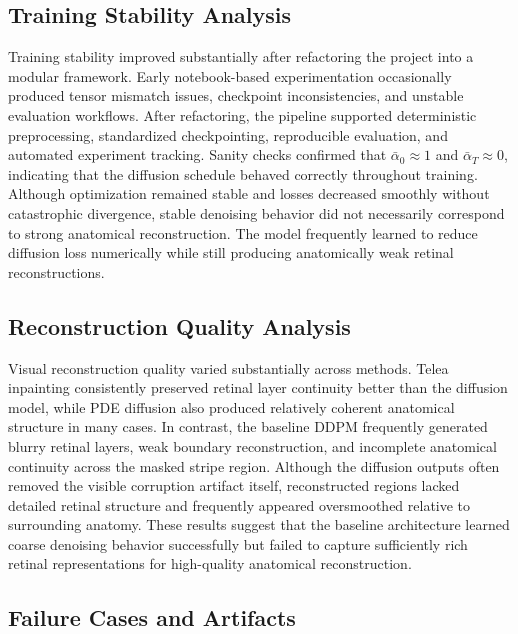 \documentclass[12pt,oneside]{article}
\begin{document}
\subsection*{Training Stability Analysis}

Training stability improved substantially after refactoring the project into a modular framework. Early notebook-based experimentation occasionally produced tensor mismatch issues, checkpoint inconsistencies, and unstable evaluation workflows. After refactoring, the pipeline supported deterministic preprocessing, standardized checkpointing, reproducible evaluation, and automated experiment tracking. Sanity checks confirmed that \(\bar{\alpha}_0 \approx 1\) and \(\bar{\alpha}_T \approx 0\), indicating that the diffusion schedule behaved correctly throughout training. Although optimization remained stable and losses decreased smoothly without catastrophic divergence, stable denoising behavior did not necessarily correspond to strong anatomical reconstruction. The model frequently learned to reduce diffusion loss numerically while still producing anatomically weak retinal reconstructions.

\subsection*{Reconstruction Quality Analysis}

Visual reconstruction quality varied substantially across methods. Telea inpainting consistently preserved retinal layer continuity better than the diffusion model, while PDE diffusion also produced relatively coherent anatomical structure in many cases. In contrast, the baseline DDPM frequently generated blurry retinal layers, weak boundary reconstruction, and incomplete anatomical continuity across the masked stripe region. Although the diffusion outputs often removed the visible corruption artifact itself, reconstructed regions lacked detailed retinal structure and frequently appeared oversmoothed relative to surrounding anatomy. These results suggest that the baseline architecture learned coarse denoising behavior successfully but failed to capture sufficiently rich retinal representations for high-quality anatomical reconstruction.

\subsection*{Failure Cases and Artifacts}
\end{document}
